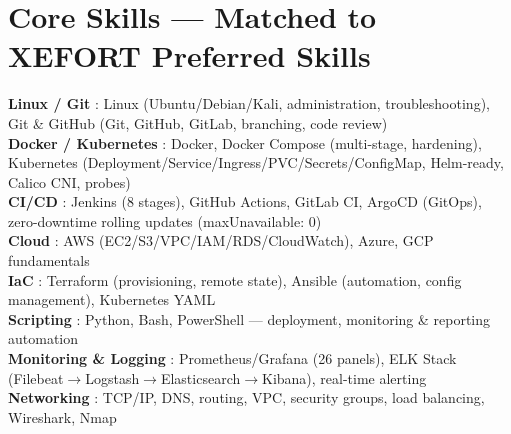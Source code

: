 \documentclass[a4paper,9pt]{article}
\begin{document}
\section{Core Skills — Matched to XEFORT Preferred Skills}
\textbf{Linux / Git} : Linux (Ubuntu/Debian/Kali, administration, troubleshooting), Git \& GitHub (Git, GitHub, GitLab, branching, code review)\\[0.3pt]
\textbf{Docker / Kubernetes} : Docker, Docker Compose (multi-stage, hardening), Kubernetes (Deployment/Service/Ingress/PVC/Secrets/ConfigMap, Helm-ready, Calico CNI, probes)\\[0.3pt]
\textbf{CI/CD} : Jenkins (8 stages), GitHub Actions, GitLab CI, ArgoCD (GitOps), zero-downtime rolling updates (maxUnavailable: 0)\\[0.3pt]
\textbf{Cloud} : AWS (EC2/S3/VPC/IAM/RDS/CloudWatch), Azure, GCP fundamentals\\[0.3pt]
\textbf{IaC} : Terraform (provisioning, remote state), Ansible (automation, config management), Kubernetes YAML\\[0.3pt]
\textbf{Scripting} : Python, Bash, PowerShell — deployment, monitoring \& reporting automation\\[0.3pt]
\textbf{Monitoring \& Logging} : Prometheus/Grafana (26 panels), ELK Stack (Filebeat$\to$Logstash$\to$Elasticsearch$\to$Kibana), real-time alerting\\[0.3pt]
\textbf{Networking} : TCP/IP, DNS, routing, VPC, security groups, load balancing, Wireshark, Nmap
\end{document}
